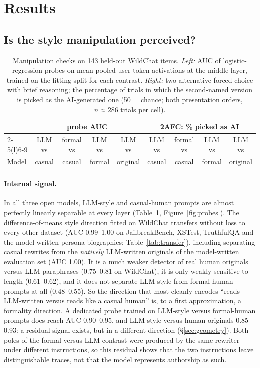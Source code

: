 \section{Results}

\subsection{Is the style manipulation perceived?}
\label{sec:manip}

\begin{table}[t]
\centering\small
\caption{Manipulation checks on 143 held-out WildChat items. \emph{Left:} AUC of logistic-regression probes on mean-pooled user-token activations at the middle layer, trained on the fitting split for each contrast. \emph{Right:} two-alternative forced choice with brief reasoning; the percentage of trials in which the second-named version is picked as the AI-generated one (50 = chance; both presentation orders, $n\approx286$ trials per cell).}
\label{tab:manip}
\begin{tabular}{lcccccccc}
\toprule
& \multicolumn{4}{c}{probe AUC} & \multicolumn{4}{c}{2AFC: \% picked as AI} \\ \cmidrule(lr){2-5}\cmidrule(l){6-9}
& LLM vs & formal vs & LLM vs & LLM vs & LLM vs & formal vs & LLM vs & LLM vs \\
Model & casual & casual & formal & original & casual & casual & formal & original \\
\midrule

\end{tabular}
\end{table}

\paragraph{Internal signal.} In all three open models, LLM-style and casual-human prompts are almost perfectly linearly separable at every layer (Table~\ref{tab:manip}, Figure~\ref{fig:probes}). The difference-of-means style direction fitted on WildChat transfers without loss to every other dataset (AUC 0.99--1.00 on JailbreakBench, XSTest, TruthfulQA and the model-written persona biographies; Table~\ref{tab:transfer}), including separating casual rewrites from the \emph{natively} LLM-written originals of the model-written evaluation set (AUC 1.00). It is a much weaker detector of real human originals versus LLM paraphrases (0.75--0.81 on WildChat), it is only weakly sensitive to length (0.61--0.62), and it does not separate LLM-style from formal-human prompts at all (0.48--0.55). So the direction that most cleanly encodes ``reads LLM-written versus reads like a casual human'' is, to a first approximation, a formality direction. A dedicated probe trained on LLM-style versus formal-human prompts does reach AUC 0.90--0.95, and LLM-style versus human originals 0.85--0.93: a residual signal exists, but in a different direction (\S\ref{sec:geometry}). Both poles of the formal-versus-LLM contrast were produced by the same rewriter under different instructions, so this residual shows that the two instructions leave distinguishable traces, not that the model represents authorship as such.

